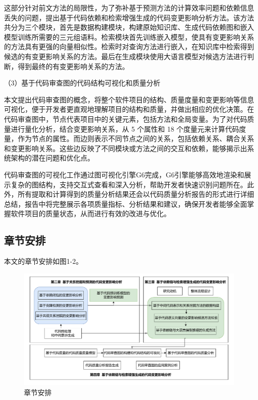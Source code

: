 这部分针对前文方法的局限性，为了弥补基于预测方法的计算效率问题和依赖信息丢失的问题，提出基于代码依赖和检索增强生成的代码变更影响分析方法。该方法共分为三个模块，首先是数据构建模块，构建原始知识库、生成代码依赖图和嵌入模型训练所需要的三元组语料。检索模块首先训练嵌入模型，使具有变更影响关系的方法具有更强的向量相似性。检索时对查询方法进行嵌入，在知识库中检索得到候选的有变更影响关系的方法。最后在生成模块使用大语言模型对候选方法进行判断，得到最终的有变更影响关系的方法。

（3）基于代码审查图的代码结构可视化和质量分析

本文提出代码审查图的概念，将整个软件项目的结构、质量度量和变更影响等信息可视化，便于开发者更直观地理解项目的结构和质量，并做出相应的优化决策。在代码审查图中，节点代表项目中的关键元素，包括方法和全局变量。为了对代码质量进行量化分析，结合变更影响关系，从 5 个属性和 18 个度量元来计算代码度量，作为节点的属性。而边则表示不同节点之间的关系，包括依赖关系、耦合关系和变更影响关系。这些边反映了不同模块或方法之间的交互和依赖，能够揭示出系统架构的潜在问题和优化点。

代码审查图的可视化工作通过图可视化引擎G6完成，G6引擎能够高效地渲染和展示复杂的图结构，支持交互式查看和深入分析，帮助开发者快速识别问题所在。此外，所有提取和计算得到的质量分析结果还会以代码质量分析报告的形式进行详细总结，报告中将完整展示各项质量指标、分析结果和建议，确保开发者能够全面掌握软件项目的质量状态，从而进行有效的改进与优化。

\subsection{章节安排}

本文的章节安排如图1-2。

\begin{figure}[h]
\centering
\includegraphics[width = 1.0\textwidth]{figures/1_章节结构图.pdf}
\caption{章节安排}
\end{figure}

